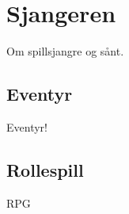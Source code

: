 \section{Sjangeren}\label{sec:sjangre}
Om spillsjangre og sånt.
\subsection{Eventyr}\label{sec:eventyr}
Eventyr!
\subsection{Rollespill}\label{sec:rollespill}
RPG
